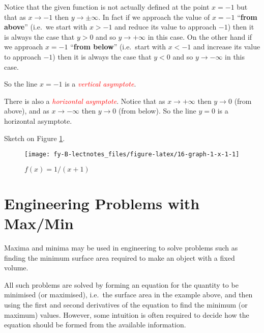 \documentclass[
  11pt,
  oneside]{book}
\newcommand{\slide}{}
\theoremstyle{definition}
\theoremstyle{definition}
\theoremstyle{definition}
\theoremstyle{definition}
\theoremstyle{remark}
\begin{document}
Notice that the given function is not actually defined at the point \(x=-1\) but that as \(x\to-1\) then \(y\to\pm\infty\). In fact if we approach the value of \(x=-1\) ``\textbf{from above}'' (i.e.~we start with \(x > -1\) and reduce its value to approach \(-1\)) then it is always the case that \(y>0\) and so \(y\to+\infty\) in this case. On the other hand if we approach \(x=-1\) ``\textbf{from below}'' (i.e.~start with \(x<-1\) and increase its value to approach \(-1\)) then it is always the case that \(y<0\) and so \(y\to-\infty\) in this case.

So the line \(x=-1\) is a \textcolor{red}{\em vertical asymptote}.

\slide

There is also a \textcolor{red}{\em horizontal asymptote}. Notice that as \(x\to+\infty\) then \(y\to 0\) (from above), and as \(x\to-\infty\) then \(y\to0\) (from below). So the line \(y=0\) is a horizontal asymptote.

\begin{slidesonly}

\vfill

\end{slidesonly}

Sketch on Figure \ref{fig:16-graph-1-x-1}.

\begin{figure}

{\centering \texttt{[image: fy-B-lectnotes\_files/figure-latex/16-graph-1-x-1-1]} 

}

\caption{$f(x)=1/(x+1)$}\label{fig:16-graph-1-x-1}
\end{figure}

\slide

\section{Engineering Problems with Max/Min}\label{engineering-problems-with-maxmin}

Maxima and minima may be used in engineering to solve problems such as finding the minimum surface area required to make an object with a fixed volume.

All such problems are solved by forming an equation for the quantity to be minimised (or maximised), i.e.~the surface area in the example above, and then using the first and second derivatives of the equation to find the minimum (or maximum) values. However, some intuition is often required to decide how the equation should be formed from the available information.
\end{document}
